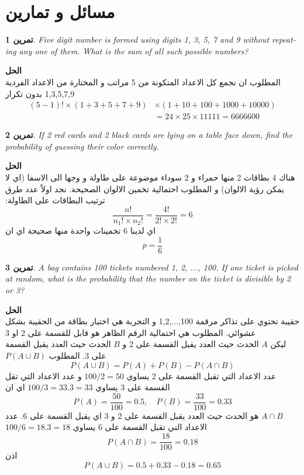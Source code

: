 \documentclass[14pt, a4paper, leqno]{extarticle}
\newcommand{\en}{\textenglish}
\theoremstyle{theoremstyle}
\newtheorem{example}{تمرين}
\newenvironment{solution}{\noindent\textbf{الحل}\vspace{3pt}\\}{}
\begin{document}
	
	
	\section*{مسائل و تمارين}
	
	\begin{example}
		\en{Five digit number is formed using digits 1, 3, 5, 7 and 9 without repeating any one of them. What is the sum of all such possible numbers?}
	\end{example}
	
	\begin{solution}
		المطلوب ان نجمع كل الاعداد المتكونة من 5 مراتب و المختارة من الاعداد الفردية 1,3,5,7,9 بدون تكرار
		\begin{align*}
		(5-1)! \times (1+3+5+7+9) &\times (1+10+100+1000+10000)  \\
		& = 24 \times 25 \times 11111  = 6666600
		\end{align*}
	\end{solution}
	
	\begin{example}
		\en{If 2 red cards and 2 black cards are lying on a table face down, find the probability of guessing their color correctly.}
	\end{example}
	
	\begin{solution}
		هناك 4 بطاقات 2 منها حمراء و 2 سوداء موضوعة على طاولة و وجها الى الاسفا (اي لا يمكن رؤية الالوان) و المطلوب احتمالية تخمين الالوان الصحيحة. نجد اولاً عدد طرق ترتيب البطاقات على الطاولة:
		\[
		\frac{n!}{n_1! \times n_2!} = \frac{4!}{2!\times 2!} = 6
		\]
		اي لدينا 6 تخمينات واحدة منها صحيحة اي ان
		\[
		p = \frac{1}{6}
		\]
	\end{solution}
	
	\begin{example}
		\en{A bag contains 100 tickets numbered 1, 2, ..., 100. If one ticket is picked at random, what is the probability that the number on the ticket is divisible by 2 or 3?}
	\end{example}
	
	\begin{solution}
		حقيبة تحتوي على تذاكر مرقمة 100,...,1,2 و التجربة هي اختيار بطاقة من الحقيبة بشكل عشوائي. المطلوب هي احتمالية الرقم الظاهر هو قابل للقسمة على 2 او 3\\
ليكن \(A\) الحدث حيث العدد يقبل القسمة على 2 و \(B\) الحدث حيث العدد يقبل القسمة على 3. المطلوب \(P(A\cup B)\) 
    \[
    P(A\cup B) = P(A) + P(B) - P(A \cap B)
    \]
    عدد الاعداد التي تقبل القسمة على 2 يساوي \(100/2=50\) و عدد الاعداد التي تقل القسمة على 3 يساوي \(100/3=33.3=33\) اي ان
    \[
    P(A) = \frac{50}{100} = 0.5, \quad P(B) = \frac{33}{100} = 0.33
    \]
    \(A\cap B\) هو الحدث حيث العدد يقبل القسمة على 2 و 3 اي يقبل القسمة على 6. عدد الاعداد التي تقبل القسمة على 6 يساوي \(100/6=18.3=18\)
    \[
    P(A\cap B) = \frac{18}{100} = 0.18
    \]
    اذن
    \[
    P(A\cup B) = 0.5 + 0.33 - 0.18 = 0.65
    \]
	\end{solution}
	
\end{document}
